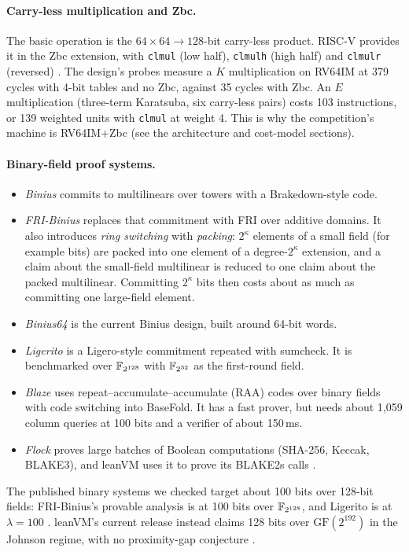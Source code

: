 \paragraph{Carry-less multiplication and Zbc.} The basic operation is the $64\times64\to128$-bit
carry-less product. RISC-V provides it in the Zbc extension, with \texttt{clmul} (low half),
\texttt{clmulh} (high half) and \texttt{clmulr} (reversed) \cite{RISCV-Bitmanip}. The design's
probes measure a $K$ multiplication on RV64IM at 379 cycles with 4-bit tables and no Zbc, against
35 cycles with Zbc. An $E$ multiplication (three-term Karatsuba, six carry-less pairs) costs 103
instructions, or 139 weighted units with \texttt{clmul} at weight 4. This is why the competition's machine is RV64IM+Zbc (see the
architecture and cost-model sections).

\paragraph{Binary-field proof systems.}
\begin{itemize}[nosep]
\item \emph{Binius} \cite{DP23-Binius} commits to multilinears over towers with a Brakedown-style
  code.
\item \emph{FRI-Binius} \cite{DP24-FRIBinius} replaces that commitment with FRI over additive
  domains. It also introduces \emph{ring switching} with \emph{packing}: $2^\kappa$ elements of a
  small field (for example bits) are packed into one element of a degree-$2^\kappa$ extension, and
  a claim about the small-field multilinear is reduced to one claim about the packed multilinear.
  Committing $2^\kappa$ bits then costs about as much as committing one large-field element.
\item \emph{Binius64} \cite{Binius64} is the current Binius design, built around 64-bit words.
\item \emph{Ligerito} \cite{NA25-Ligerito} is a Ligero-style commitment repeated with sumcheck.
  It is benchmarked over $\mathbb{F}_{2^{128}}$ with $\mathbb{F}_{2^{32}}$ as the first-round field.
\item \emph{Blaze} \cite{BCFRRZ25-Blaze} uses repeat--accumulate--accumulate (RAA) codes over binary
  fields with code switching into BaseFold. It has a fast prover, but needs about 1{,}059 column
  queries at 100 bits and a verifier of about 150\,ms.
\item \emph{Flock} \cite{BRW26-Flock} proves large batches of Boolean computations (SHA-256, Keccak,
  BLAKE3), and leanVM uses it to prove its BLAKE2s calls \cite{leanVM}.
\end{itemize}
The published binary systems we checked target about 100 bits over 128-bit fields: FRI-Binius's
provable analysis is at 100 bits over $\mathbb{F}_{2^{128}}$, and Ligerito is at $\lambda=100$
\cite{DP24-FRIBinius,NA25-Ligerito}. leanVM's current release instead claims 128 bits over
$\mathrm{GF}(2^{192})$ in the Johnson regime, with no proximity-gap conjecture \cite{leanVM}.

